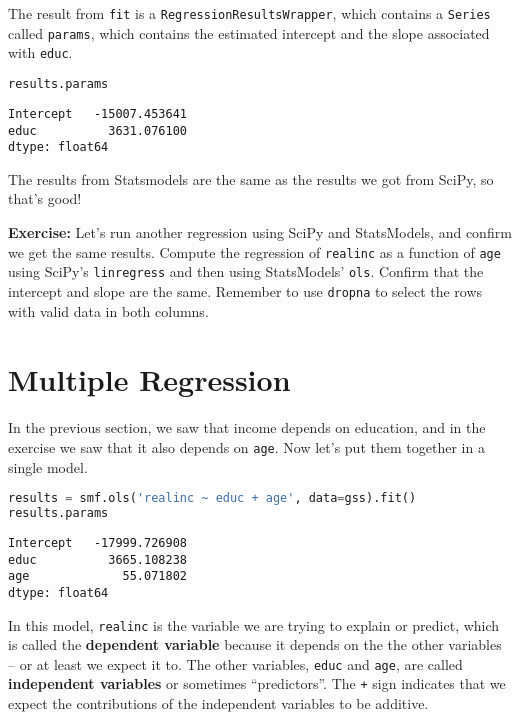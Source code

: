 The result from \passthrough{\lstinline!fit!} is a \passthrough{\lstinline!RegressionResultsWrapper!},
which contains a \passthrough{\lstinline!Series!} called
\passthrough{\lstinline!params!}, which contains the estimated intercept
and the slope associated with \passthrough{\lstinline!educ!}.

\begin{lstlisting}[language=Python,style=source]
results.params
\end{lstlisting}

\begin{lstlisting}[style=output]
Intercept   -15007.453641
educ          3631.076100
dtype: float64
\end{lstlisting}

The results from Statsmodels are the same as the results we got from
SciPy, so that's good!

\textbf{Exercise:} Let's run another regression using SciPy and
StatsModels, and confirm we get the same results. Compute the regression
of \passthrough{\lstinline!realinc!} as a function of
\passthrough{\lstinline!age!} using SciPy's
\passthrough{\lstinline!linregress!} and then using StatsModels'
\passthrough{\lstinline!ols!}. Confirm that the intercept and slope are
the same. Remember to use \passthrough{\lstinline!dropna!} to select the
rows with valid data in both columns.

\section{Multiple Regression}\label{multiple-regression}

In the previous section, we saw that income depends on education, and in
the exercise we saw that it also depends on
\passthrough{\lstinline!age!}. Now let's put them together in a single
model.

\begin{lstlisting}[language=Python,style=source]
results = smf.ols('realinc ~ educ + age', data=gss).fit()
results.params
\end{lstlisting}

\begin{lstlisting}[style=output]
Intercept   -17999.726908
educ          3665.108238
age             55.071802
dtype: float64
\end{lstlisting}

In this model, \passthrough{\lstinline!realinc!} is the variable we are
trying to explain or predict, which is called the \textbf{dependent
variable} because it depends on the the other variables -- or at least
we expect it to. The other variables, \passthrough{\lstinline!educ!} and
\passthrough{\lstinline!age!}, are called \textbf{independent variables}
or sometimes ``predictors''. The \passthrough{\lstinline!+!} sign
indicates that we expect the contributions of the independent variables
to be additive.

